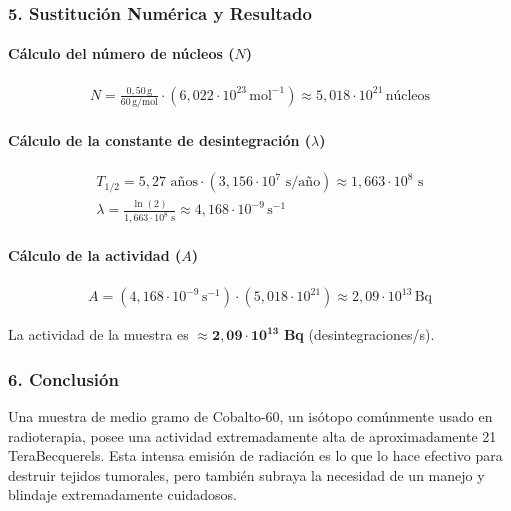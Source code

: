 \subsubsection*{5. Sustitución Numérica y Resultado}
\paragraph*{Cálculo del número de núcleos ($N$)}
\begin{gather}
    N = \frac{0,50 \, \text{g}}{60 \, \text{g/mol}} \cdot (6,022 \cdot 10^{23} \, \text{mol}^{-1}) \approx 5,018 \cdot 10^{21} \, \text{núcleos}
\end{gather}
\paragraph*{Cálculo de la constante de desintegración ($\lambda$)}
\begin{gather}
    T_{1/2} = 5,27 \text{ años} \cdot (3,156 \cdot 10^7 \text{ s/año}) \approx 1,663 \cdot 10^8 \text{ s} \\
    \lambda = \frac{\ln(2)}{1,663 \cdot 10^8 \text{ s}} \approx 4,168 \cdot 10^{-9} \, \text{s}^{-1}
\end{gather}
\paragraph*{Cálculo de la actividad ($A$)}
\begin{gather}
    A = (4,168 \cdot 10^{-9} \, \text{s}^{-1}) \cdot (5,018 \cdot 10^{21}) \approx 2,09 \cdot 10^{13} \, \text{Bq}
\end{gather}
\begin{cajaresultado}
    La actividad de la muestra es $\boldsymbol{\approx 2,09 \cdot 10^{13}}$ \textbf{Bq} (desintegraciones/s).
\end{cajaresultado}

\subsubsection*{6. Conclusión}
\begin{cajaconclusion}
Una muestra de medio gramo de Cobalto-60, un isótopo comúnmente usado en radioterapia, posee una actividad extremadamente alta de aproximadamente 21 TeraBecquerels. Esta intensa emisión de radiación es lo que lo hace efectivo para destruir tejidos tumorales, pero también subraya la necesidad de un manejo y blindaje extremadamente cuidadosos.
\end{cajaconclusion}

\newpage
